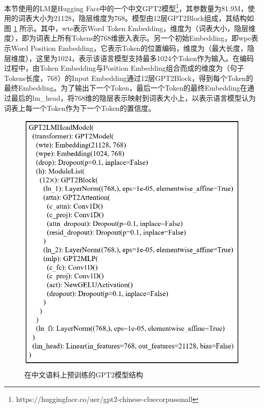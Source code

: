 
本节使用的LM是Hugging Face中的一个中文GPT2模型\footnote{https://huggingface.co/uer/gpt2-chinese-cluecorpussmall}，其参数量为81.9M，使用的词表大小为21128，隐层维度为768。模型由12层GPT2Block组成，其结构如图 \ref{GPT2-small} 所示。其中，wte表示Word Token Embedding，维度为（词表大小，隐层维度），即为词表上所有Tokens的768维嵌入表示。另一个初始Embedding，即wpe表示Word Position Embedding，它表示Token的位置编码，维度为（最大长度，隐层维度），这里为1024，表示该语言模型支持最多1024个Token作为输入。在编码过程中，由Token Embedding与Position Embedding组合而成的维度为（句子Tokens长度，768）的Input Embedding通过12层GPT2Block，得到每个Token的最终Embedding。为了输出下一个Token，最后一个Token的最终Embedding在通过最后的lm\_head，将768维的隐层表示映射到词表大小上，以表示语言模型认为词表上每一个Token作为下一个Token的置信度。

\begin{figure}[h]
	\centering
	\includegraphics[width=0.7\linewidth]{figures/GPT2_Structure.png}
	\caption{在中文语料上预训练的GPT2模型结构}
	\label{GPT2-small}
\end{figure}

